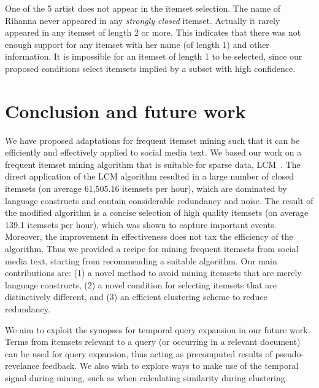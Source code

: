 \documentclass{sig-alternate}
\begin{document}
One of the 5 artist does not appear in the itemset selection. 
The name of Rihanna never appeared in any \emph{strongly closed} itemset.
Actually it rarely appeared in any itemset of length 2 or more. 
This indicates that there was not enough support for any itemset
with her name (of length 1) and other information.
It is impossible for an itemset of length 1 to be selected,
since our proposed conditions select itemsets implied
by a subset with high confidence.


\section{Conclusion and future work}
\label{sec:concfut}
We have proposed adaptations for frequent itemset mining 
such that it can be efficiently and effectively applied to 
social media text.
We based our work on a frequent itemset mining algorithm that is suitable
for sparse data, LCM~\cite{uno2004lcm}.
The direct application of the LCM algorithm resulted 
in a large number of closed itemsets (on average 61,505.16 itemsets 
per hour),
which are dominated by language constructs
and contain considerable redundancy and noise.
The result of the modified algorithm is a concise selection of
high quality itemsets (on average 139.1 itemsets 
per hour),
which was shown to capture important events.
Moreover, the improvement in effectiveness does not tax
the efficiency of the algorithm.
Thus we provided a recipe for mining frequent itemsets
from social media text, starting from recommending
a suitable algorithm. Our main contributions are: 
(1) a novel method to avoid mining itemsets that are 
merely language constructs,
(2) a novel condition for selecting itemsets that are distinctively different, and
(3) an efficient clustering scheme to reduce redundancy.

We aim to exploit the synopses for temporal query expansion in our future work. Terms from itemsets relevant to a query (or occurring in a relevant document)
can be used for query expansion, thus acting as precomputed results of 
pseudo-revelance feedback.
We also wish to explore ways to make use of the temporal signal during mining,
such as when calculating similarity during clustering.

 

\end{document}
